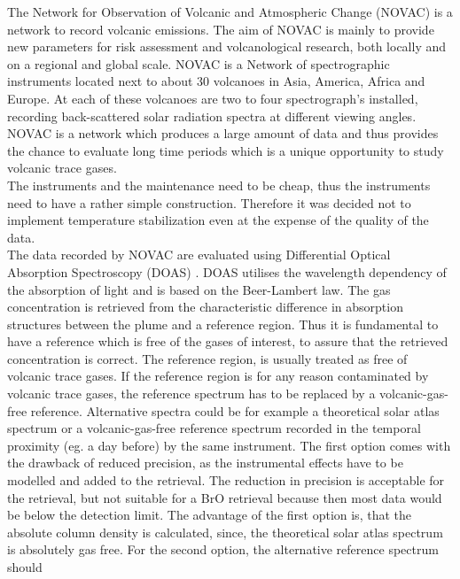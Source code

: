 %
\newline
%
The Network for Observation of Volcanic and Atmospheric Change (NOVAC) is a network to record volcanic emissions. The aim of NOVAC is mainly to provide new parameters for risk assessment and volcanological research, both locally and on a regional and global scale.
NOVAC is a Network of spectrographic instruments located next to about 30 volcanoes in Asia, America, Africa and Europe. At each of these volcanoes are two to four spectrograph's installed, recording back-scattered solar radiation spectra at different viewing angles.\\
NOVAC is a network which produces a large amount of data and thus provides the chance to evaluate long time periods which is a unique opportunity to study volcanic trace gases.\\
The instruments and the maintenance need to be cheap, thus the instruments need to have a rather simple construction. Therefore it was decided not to implement temperature stabilization even at the expense of the quality of the data.\\
%
\newline
%
The data recorded by NOVAC are evaluated using Differential Optical Absorption Spectroscopy (DOAS) \citet{platt2008differential}. DOAS utilises the wavelength dependency of the absorption of light and is based on the Beer-Lambert law. The gas concentration is retrieved from the characteristic difference in absorption structures between the plume and a reference region. Thus it is fundamental to have a reference which is free of the gases of interest, to assure that the retrieved concentration is correct.
%
\newline
%
The reference region, is usually treated as free of
volcanic trace gases. If the reference region is for any reason
contaminated by volcanic trace gases, the reference spectrum has to be
replaced by a volcanic-gas-free reference. Alternative spectra could be for example a
theoretical solar atlas spectrum or a volcanic-gas-free reference
spectrum recorded in the temporal proximity (eg. a day before) by the same instrument.
The first option comes with the drawback of reduced precision, as the
instrumental effects have to be modelled and added to the retrieval. The reduction in precision is acceptable for the  retrieval, but not suitable for a BrO retrieval because then most data would be below the detection limit. The advantage of the first option is, that the absolute column density is calculated, since, the theoretical solar atlas spectrum is absolutely gas free. For the second option, the alternative reference spectrum should
